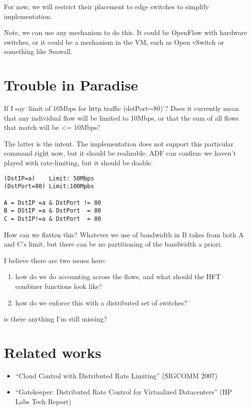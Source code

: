For now, we will restrict their placement to edge switches to simplify 
implementation.

Note, we can use any mechanism to do this. It could be OpenFlow
with hardware switches, or it could be a mechanism in the VM, such as
Open vSwitch or something like Seawall.

\section{Trouble in Paradise}

If I say `limit of 10Mbps for http traffic (dstPort=80)'? Does it currently mean that any individual flow will be limited to 10Mbps, or that the sum of all flows that match will be <= 10Mbps?

The latter is the intent. The implementation does not support this
particular command right now, but it should be realizable. ADF can
confirm--we haven't played with rate-limiting, but it should be
doable.

\begin{verbatim}
(DstIP=a)    Limit: 50Mbps
(DstPort=80) Limit:100Mpbs
 
A = DstIP =a & DstPort != 80
B = DStIP =a & DstPort  = 80
C = DstIP!=a & DstPort  = 80
\end{verbatim}

How can we flatten this? Whatever we use of bandwidth in B takes from both A and C's limit, but there can be no partitioning of the bandwidth a priori.

I believe there are two issues here:
\begin{enumerate}
\item how do we do accounting across the flows, and what should the HFT combiner functions look like?
\item how do we enforce this with a distributed set of switches?
\end{enumerate}

is there anything I'm still missing?

\section{Related works}

\begin{itemize}
\item ``Cloud Control with Distributed Rate Limiting'' (SIGCOMM 2007)
\item ``Gatekeeper: Distributed Rate Control for Virtualized Datacenters'' (HP Labs Tech Report)
\end{itemize}

